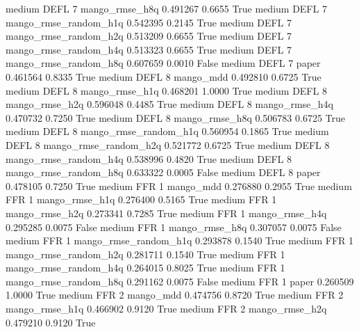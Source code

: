     medium     DEFL                 7        mango_rmse_h8q   0.491267      0.6655    True
    medium     DEFL                 7 mango_rmse_random_h1q   0.542395      0.2145    True
    medium     DEFL                 7 mango_rmse_random_h2q   0.513209      0.6655    True
    medium     DEFL                 7 mango_rmse_random_h4q   0.513323      0.6655    True
    medium     DEFL                 7 mango_rmse_random_h8q   0.607659      0.0010   False
    medium     DEFL                 7                 paper   0.461564      0.8335    True
    medium     DEFL                 8             mango_mdd   0.492810      0.6725    True
    medium     DEFL                 8        mango_rmse_h1q   0.468201      1.0000    True
    medium     DEFL                 8        mango_rmse_h2q   0.596048      0.4485    True
    medium     DEFL                 8        mango_rmse_h4q   0.470732      0.7250    True
    medium     DEFL                 8        mango_rmse_h8q   0.506783      0.6725    True
    medium     DEFL                 8 mango_rmse_random_h1q   0.560954      0.1865    True
    medium     DEFL                 8 mango_rmse_random_h2q   0.521772      0.6725    True
    medium     DEFL                 8 mango_rmse_random_h4q   0.538996      0.4820    True
    medium     DEFL                 8 mango_rmse_random_h8q   0.633322      0.0005   False
    medium     DEFL                 8                 paper   0.478105      0.7250    True
    medium      FFR                 1             mango_mdd   0.276880      0.2955    True
    medium      FFR                 1        mango_rmse_h1q   0.276400      0.5165    True
    medium      FFR                 1        mango_rmse_h2q   0.273341      0.7285    True
    medium      FFR                 1        mango_rmse_h4q   0.295285      0.0075   False
    medium      FFR                 1        mango_rmse_h8q   0.307057      0.0075   False
    medium      FFR                 1 mango_rmse_random_h1q   0.293878      0.1540    True
    medium      FFR                 1 mango_rmse_random_h2q   0.281711      0.1540    True
    medium      FFR                 1 mango_rmse_random_h4q   0.264015      0.8025    True
    medium      FFR                 1 mango_rmse_random_h8q   0.291162      0.0075   False
    medium      FFR                 1                 paper   0.260509      1.0000    True
    medium      FFR                 2             mango_mdd   0.474756      0.8720    True
    medium      FFR                 2        mango_rmse_h1q   0.466902      0.9120    True
    medium      FFR                 2        mango_rmse_h2q   0.479210      0.9120    True
